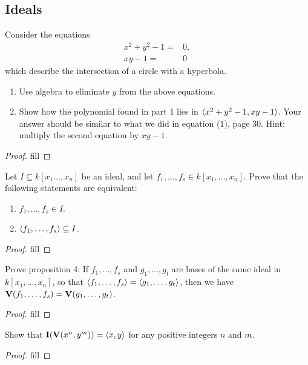 \subsection{Ideals}


\begin{exercise}{1}
Consider the equations
\begin{align*}
    x^2+y^2-1 =& 0,\\
    xy-1 =& 0
\end{align*}
which describe the intersection of a circle with a hyperbola.
\begin{enumerate}
    \item Use algebra to eliminate $y$ from the above equations.
    \item Show how the polynomial found in part 1 lies in $\langle x^2+y^2-1, xy-1\rangle$. Your answer should be similar to what we did in equation (1), page 30. Hint: multiply the second equation by $xy-1$.
\end{enumerate}
\end{exercise}
\begin{proof}
fill
\end{proof}

\begin{exercise}{2}
Let $I\subseteq k[x_1\dots,x_n]$ be an ideal, and let $f_1,\dots,f_s\in k[x_1,\dots,x_n]$. Prove that the following statements are equivalent:
\begin{enumerate}
    \item $f_1,\dots,f_s\in I$.
    \item $\langle f_1,\dots,f_s\rangle\subseteq I$.
\end{enumerate}
\end{exercise}
\begin{proof}
fill
\end{proof}

\begin{exercise}{4}
Prove proposition 4: If $f_1,\dots,f_s$ and $g_1,\dots,g_t$ are bases of the same ideal in $k[x_1,\dots,x_n]$, so that $\langle f_1,\dots,f_s\rangle=\langle g_1,\dots,g_t\rangle$, then we have $\mathbf{V}(f_1,\dots,f_s)=\mathbf{V}(g_1,\dots,g_t)$.
\end{exercise}
\begin{proof}
fill
\end{proof}

\begin{exercise}{7}
Show that $\mathbf{I}(\mathbf{V}(x^n,y^m))=\langle x,y\rangle$ for any positive integers $n$ and $m$.
\end{exercise}
\begin{proof}
fill
\end{proof}

